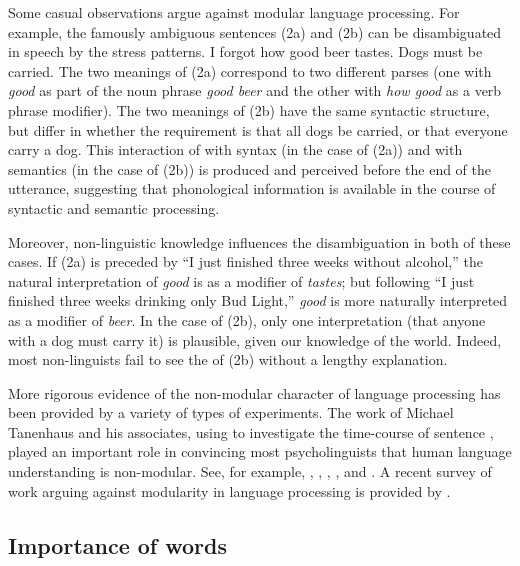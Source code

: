 \documentclass[a4paper]{article}
\begin{document}
Some casual observations argue against modular language processing.  For example, the famously ambiguous sentences (2a) and (2b) can be disambiguated in speech by the stress patterns.
\eal
\ex I forgot how good beer tastes.
\ex Dogs must be carried.
\zl
The two meanings of (2a) correspond to two different parses (one with \emph{good} as part of the noun phrase \emph{good beer} and the other with \emph{how good} as a verb phrase modifier).  The two meanings of (2b) have the same syntactic structure, but differ in whether the requirement is that all dogs be carried, or that everyone carry a dog.  This interaction of  with syntax (in the case of (2a)) and with semantics (in the case of (2b)) is produced and perceived before the end of the utterance, suggesting that phonological information is available in the course of syntactic and semantic processing.  

Moreover, non-linguistic knowledge influences the disambiguation in both of these cases.  If (2a) is preceded by ``I just finished three weeks without alcohol,'' the natural interpretation of \emph{good} is as a modifier of \emph{tastes}; but following ``I just finished three weeks drinking only Bud Light,'' \emph{good} is more naturally interpreted as a modifier of \emph{beer}.  In the case of (2b), only one interpretation (that anyone with a dog must carry it) is plausible, given our knowledge of the world.  Indeed, most non-linguists fail to see the  of (2b) without a lengthy explanation.  

More rigorous evidence of the non-modular character of language processing has been provided by a variety of types of experiments.  The work of Michael Tanenhaus  and his associates, using  to investigate the time-course of sentence , played an important role in convincing most psycholinguists that human language understanding is non-modular.  See, for example, \citet{EberhardEtal95}, \citet{McMurrayEtal2008}, \citet{TSKES95a}, \citet{TSKES96a}, and \citet{TanenhausTrueswell95}. A recent survey of work arguing against modularity in language processing is provided by \citet{SpevackEtal2018}.  

\subsection{Importance of words}
\label{sec-importance-of-words}
\end{document}
